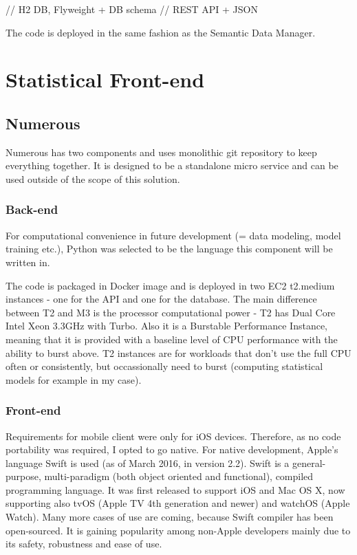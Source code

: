 // H2 DB, Flyweight + DB schema
// REST API + JSON

The code is deployed in the same fashion as the Semantic Data Manager.

\section{Statistical Front-end}

\subsection{Numerous}
Numerous has two components and uses monolithic git repository to keep everything together. It is designed to be a standalone micro service and can be used outside of the scope of this solution.

\subsubsection{Back-end}
For computational convenience in future development (= data modeling, model training etc.), Python was selected to be the language this component will be written in.

The code is packaged in Docker image and is deployed in two EC2 t2.medium instances - one for the API and one for the database. The main difference between T2 and M3 is the processor computational power - T2 has Dual Core Intel Xeon 3.3GHz with Turbo. Also it is a Burstable Performance Instance, meaning that it is provided with a baseline level of CPU performance with the ability to burst above. T2 instances are for workloads that don't use the full CPU often or consistently, but occassionally need to burst (computing statistical models for example in my case).

\subsubsection{Front-end}
Requirements for mobile client were only for iOS devices. Therefore, as no code portability was required, I opted to go native. For native development, Apple's language Swift is used (as of March 2016, in version 2.2). Swift is a general-purpose, multi-paradigm (both object oriented and functional), compiled programming language. It was first released to support iOS and Mac OS X, now supporting also tvOS (Apple TV 4th generation and newer) and watchOS (Apple Watch). Many more cases of use are coming, because Swift compiler has been open-sourced. It is gaining popularity among non-Apple developers mainly due to its safety, robustness and ease of use.

